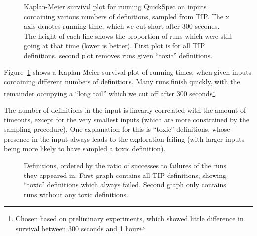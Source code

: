 \begin{figure}
  \scalebox{0.45}{}
  \scalebox{0.45}{}
  \caption{Kaplan-Meier survival plot for running QuickSpec on inputs
    containing various numbers of definitions, sampled from TIP. The x axis
    denotes running time, which we cut short after 300 seconds. The height of
    each line shows the proportion of \qspec{} runs which were still going at
    that time (lower is better). First plot is for all TIP definitions, second
    plot removes runs given ``toxic'' definitions.}
  \label{fig:survival}
\end{figure}

Figure~\ref{fig:survival} shows a Kaplan-Meier survival plot of \qspec{} running
times, when given inputs containing different numbers of definitions. Many runs
finish quickly, with the remainder occupying a ``long tail'' which we cut off
after 300 seconds\footnote{Chosen based on preliminary experiments, which showed
  little difference in survival between 300 seconds and 1 hour}.

The number of definitions in the input is linearly correlated with the amount of
timeouts, except for the very smallest inputs (which are more constrained by the
sampling procedure). One explanation for this is ``toxic'' definitions, whose
presence in the input always leads to the exploration failing (with larger
inputs being more likely to have sampled a toxic definition).

\iffalse
\begin{figure}
  \scalebox{0.45}{}
  \scalebox{0.45}{}
  \caption{Proportion of samples which timed out per size, with least-squares
    linear regression. First plot is for all TIP definitions, second removes
    runs given ``toxic'' definitions.}
  \label{fig:tailsize}
\end{figure}
\fi

\begin{figure}
  \scalebox{0.45}{}
  \scalebox{0.45}{}
  \label{fig:proportions}
  \caption{Definitions, ordered by the ratio of successes to failures of the
    runs they appeared in. First graph contains all TIP definitions, showing
    ``toxic'' definitions which always failed. Second graph only contains runs
    without any toxic definitions.}
\end{figure}

